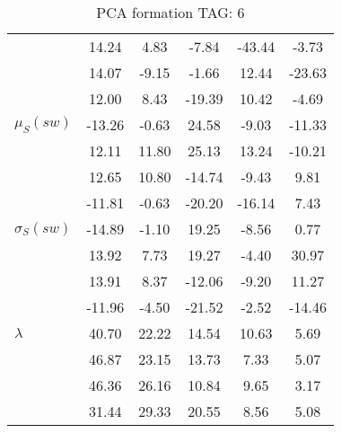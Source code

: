\begin{table}[h!]
\begin{center}
\begin{tabular}{| l || c | c | c | c | c |}
 & 14.24  & 4.83  & -7.84  & -43.44  & -3.73 \\
 & 14.07  & -9.15  & -1.66  & 12.44  & -23.63 \\
 & 12.00  & 8.43  & -19.39  & 10.42  & -4.69 \\\hline
$\mu_S(sw)$ & -13.26  & -0.63  & 24.58  & -9.03  & -11.33 \\
 & 12.11  & 11.80  & 25.13  & 13.24  & -10.21 \\
 & 12.65  & 10.80  & -14.74  & -9.43  & 9.81 \\
 & -11.81  & -0.63  & -20.20  & -16.14  & 7.43 \\\hline
$\sigma_S(sw)$ & -14.89  & -1.10  & 19.25  & -8.56  & 0.77 \\
 & 13.92  & 7.73  & 19.27  & -4.40  & 30.97 \\
 & 13.91  & 8.37  & -12.06  & -9.20  & 11.27 \\
 & -11.96  & -4.50  & -21.52  & -2.52  & -14.46 \\\hline\hline
$\lambda$ & 40.70  & 22.22  & 14.54  & 10.63  & 5.69 \\
 & 46.87  & 23.15  & 13.73  & 7.33  & 5.07 \\
 & 46.36  & 26.16  & 10.84  & 9.65  & 3.17 \\
 & 31.44  & 29.33  & 20.55  & 8.56  & 5.08 \\\hline
\end{tabular}
\caption{PCA formation TAG: 6}
\end{center}
\end{table}